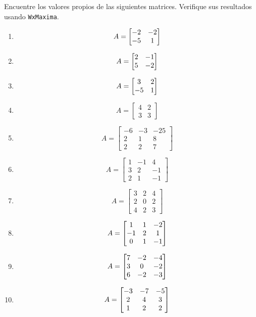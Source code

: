 \begin{problema}
\label{exe:diagonal}
 Encuentre los valores propios de las siguientes matrices. Verifique sus resultados usando \texttt{WxMaxima}.
 \begin{enumerate}

 \item $$
A=\begin{bmatrix}-2&-2\\-5&1\end{bmatrix}
 $$

 \item$$A=\begin{bmatrix}2&-1\\5&-2\end{bmatrix}$$

 \item$$A=\begin{bmatrix}3&2\\-5&1\end{bmatrix}$$
 
 \item $$A=\begin{bmatrix}
            4 & 2 \\
            3 & 3
           \end{bmatrix}
$$

\item$$
A=\begin{bmatrix}
   -6 & -3 & -25 \\
   2 & 1 & 8 \\
   2 & 2 & 7
  \end{bmatrix}
$$

\item $$
A=\begin{bmatrix}
   1 & -1 & 4 \\
   3 & 2 & -1 \\
   2 & 1 & -1
  \end{bmatrix}
$$
\item $$
A=\begin{bmatrix}
   3 & 2 & 4 \\
   2 & 0 & 2 \\
   4 & 2 & 3
  \end{bmatrix}
$$

\item$$A=\begin{bmatrix}1&1&-2\\-1&2&1\\0&1&-1\end{bmatrix}$$

\item$$A=\begin{bmatrix}7&-2&-4\\3&0&-2\\6&-2&-3\end{bmatrix}$$

\item$$A=\begin{bmatrix}-3&-7&-5\\2&4&3\\1&2&2\end{bmatrix}$$
\end{enumerate}
\end{problema}




